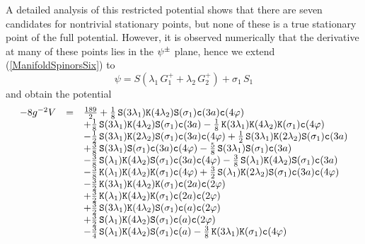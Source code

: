 \documentclass[a4paper,12pt]{article}
\begin{document}
A detailed analysis of this restricted potential shows that there
are seven candidates for nontrivial stationary points, but none of these
is a true stationary point of the full potential. However, it is
observed numerically that the derivative at many of these points lies
in the $\psi^\pm_{}$ plane, hence we extend
(\ref{ManifoldSpinorsSix}) to
\begin{equation}
\psi=S\left(\lambda_1\,G_1^+ + \lambda_2\,G_2^+\right)+\sigma_1\,S_1
\end{equation}
and obtain the potential
%
\begin{equation}
\begin{array}{lll}
-8g^{-2}V&=&
\frac{189}{2}
+\frac{1}{8}\,{\tt S}{\left(3 \lambda_1\right)} {\tt K}{\left(4 \lambda_2\right)} {\tt S}{\left( \sigma_1\right)} {\tt c}{\left(3 a\right)} {\tt c}{\left(4 \varphi\right)}\\
&&+\frac{1}{8}\,{\tt S}{\left(3 \lambda_1\right)} {\tt K}{\left(4 \lambda_2\right)} {\tt S}{\left( \sigma_1\right)} {\tt c}{\left(3 a\right)}
-\frac{1}{8}\,{\tt K}{\left(3 \lambda_1\right)} {\tt K}{\left(4 \lambda_2\right)} {\tt K}{\left( \sigma_1\right)} {\tt c}{\left(4 \varphi\right)}\\
&&-\frac{1}{2}\,{\tt S}{\left(3 \lambda_1\right)} {\tt K}{\left(2 \lambda_2\right)} {\tt S}{\left( \sigma_1\right)} {\tt c}{\left(3 a\right)} {\tt c}{\left(4 \varphi\right)}
+\frac{1}{2}\,{\tt S}{\left(3 \lambda_1\right)} {\tt K}{\left(2 \lambda_2\right)} {\tt S}{\left( \sigma_1\right)} {\tt c}{\left(3 a\right)}\\
&&+\frac{3}{8}\,{\tt S}{\left(3 \lambda_1\right)} {\tt S}{\left( \sigma_1\right)} {\tt c}{\left(3 a\right)} {\tt c}{\left(4 \varphi\right)}
-\frac{5}{8}\,{\tt S}{\left(3 \lambda_1\right)} {\tt S}{\left( \sigma_1\right)} {\tt c}{\left(3 a\right)}\\
&&-\frac{3}{8}\,{\tt S}{\left( \lambda_1\right)} {\tt K}{\left(4 \lambda_2\right)} {\tt S}{\left( \sigma_1\right)} {\tt c}{\left(3 a\right)} {\tt c}{\left(4 \varphi\right)}
-\frac{3}{8}\,{\tt S}{\left( \lambda_1\right)} {\tt K}{\left(4 \lambda_2\right)} {\tt S}{\left( \sigma_1\right)} {\tt c}{\left(3 a\right)}\\
&&-\frac{3}{8}\,{\tt K}{\left( \lambda_1\right)} {\tt K}{\left(4 \lambda_2\right)} {\tt K}{\left( \sigma_1\right)} {\tt c}{\left(4 \varphi\right)}
+\frac{3}{2}\,{\tt S}{\left( \lambda_1\right)} {\tt K}{\left(2 \lambda_2\right)} {\tt S}{\left( \sigma_1\right)} {\tt c}{\left(3 a\right)} {\tt c}{\left(4 \varphi\right)}\\
&&-\frac{3}{2}\,{\tt K}{\left(3 \lambda_1\right)} {\tt K}{\left(4 \lambda_2\right)} {\tt K}{\left( \sigma_1\right)} {\tt c}{\left(2 a\right)} {\tt c}{\left(2 \varphi\right)}\\
&&+\frac{3}{2}\,{\tt K}{\left( \lambda_1\right)} {\tt K}{\left(4 \lambda_2\right)} {\tt K}{\left( \sigma_1\right)} {\tt c}{\left(2 a\right)} {\tt c}{\left(2 \varphi\right)}\\
&&+\frac{3}{2}\,{\tt S}{\left(3 \lambda_1\right)} {\tt K}{\left(4 \lambda_2\right)} {\tt S}{\left( \sigma_1\right)} {\tt c}{\left(a\right)} {\tt c}{\left(2 \varphi\right)}\\
&&+\frac{3}{2}\,{\tt S}{\left( \lambda_1\right)} {\tt K}{\left(4 \lambda_2\right)} {\tt S}{\left( \sigma_1\right)} {\tt c}{\left(a\right)} {\tt c}{\left(2 \varphi\right)}\\
&&-\frac{3}{4}\,{\tt S}{\left( \lambda_1\right)} {\tt K}{\left(4 \lambda_2\right)} {\tt S}{\left( \sigma_1\right)} {\tt c}{\left(a\right)}
-\frac{3}{8}\,{\tt K}{\left(3 \lambda_1\right)} {\tt K}{\left( \sigma_1\right)} {\tt c}{\left(4 \varphi\right)}\\

\end{array}
\end{equation}
\end{document}
